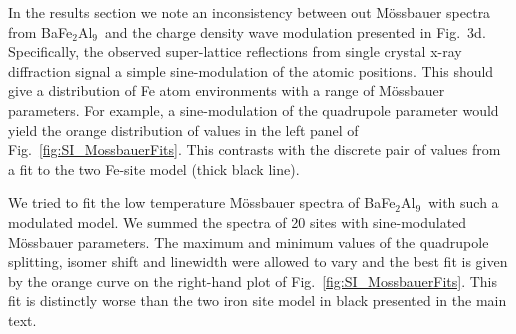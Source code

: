 \documentclass[journal=cmatex,manuscript=article]{achemso}
\newcommand{\BaFeAl}{BaFe$_2$Al$_9$}
\begin{document}
\begin{suppinfo}
In the results section we note an inconsistency between out M\"ossbauer spectra from \BaFeAl\ and the charge density wave modulation presented in Fig.~3d. Specifically, the observed super-lattice reflections from single crystal x-ray diffraction signal a simple sine-modulation of the atomic positions. This should give a distribution of Fe atom environments with a range of M\"ossbauer parameters. For example, a sine-modulation of the quadrupole parameter would yield the orange distribution of values in the left panel of Fig.~\ref{fig:SI_MossbauerFits}. This contrasts with the discrete pair of values from a fit to the two Fe-site model (thick black line).

We tried to fit the low temperature M\"ossbauer spectra of \BaFeAl\ with such a modulated model. We summed the spectra of 20 sites with sine-modulated M\"ossbauer parameters. The maximum and minimum values of the quadrupole splitting, isomer shift and linewidth were allowed to vary and the best fit is given by the orange curve on the right-hand plot of Fig.~\ref{fig:SI_MossbauerFits}. This fit is distinctly worse than the two iron site model in black presented in the main text.

\end{suppinfo}

\end{document}
